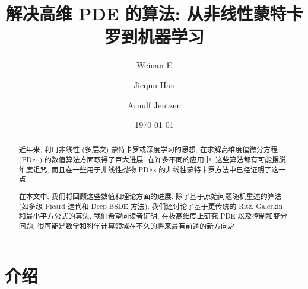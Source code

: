 \documentclass[12pt,AutoFakeBold,AutoFakeSlant]{article}
\theoremstyle{definition}
\begin{document}
	\title{解决高维 PDE 的算法: 从非线性蒙特卡罗到机器学习}




	\author[1,2]{Weinan E}
	\author[1]{Jiequn Han}
	\author[3]{Arnulf Jentzen} 

	\date{\normalsize \today}





	


	\maketitle
	\begin{abstract}
		近年来, 利用非线性 (多层次) 蒙特卡罗或深度学习的思想, 在求解高维度偏微分方程 (PDEs) 的数值算法方面取得了巨大进展. 在许多不同的应用中, 这些算法都有可能摆脱维度诅咒, 而且在一些用于非线性抛物 PDEs 的非线性蒙特卡罗方法中已经证明了这一点.

		在本文中, 我们将回顾这些数值和理论方面的进展. 除了基于原始问题随机重述的算法 (如多级 Picard 迭代和 Deep BSDE 方法), 我们还讨论了基于更传统的 Ritz, Galerkin 和最小平方公式的算法. 我们希望向读者证明, 在极高维度上研究 PDE 以及控制和变分问题, 很可能是数学和科学计算领域在不久的将来最有前途的新方向之一.
	\end{abstract}

	{
	\hypersetup{linkcolor=black}
	\tableofcontents
	}

	\section{介绍}
	\label{sec:intro}
\end{document}

